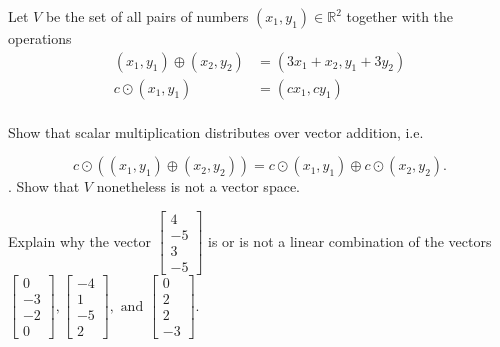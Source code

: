 \documentclass{article}
\begin{document}
\begin{exerciseStatement}
    Let \(V\) be the set of all pairs of numbers \((x_1,y_1)\in\mathbb{R}^2\)  together with the operations
\begin{align*}
(x_1,y_1)\oplus (x_2,y_2)&= (3x_1+x_2, y_1+3y_2)\\
c \odot (x_1,y_1) &= (cx_1,cy_1)\\
\end{align*}

Show that scalar multiplication distributes over vector addition, i.e.

\[c\odot \left((x_1,y_1)\oplus(x_2,y_2)\right)=c\odot(x_1,y_1)\oplus c\odot(x_2,y_2).\]
.
Show that \(V\) nonetheless is not a vector space.



  
\end{exerciseStatement}


\begin{exerciseStatement}
    Explain why the vector \(\left[\begin{array}{c}
4 \\
-5 \\
3 \\
-5
\end{array}\right]\)  is or is not a linear
combination of the vectors \(\left[\begin{array}{c}
0 \\
-3 \\
-2 \\
0
\end{array}\right] , \left[\begin{array}{c}
-4 \\
1 \\
-5 \\
2
\end{array}\right] , \text{ and } \left[\begin{array}{c}
0 \\
2 \\
2 \\
-3
\end{array}\right]\).



  
\end{exerciseStatement}
\end{document}

